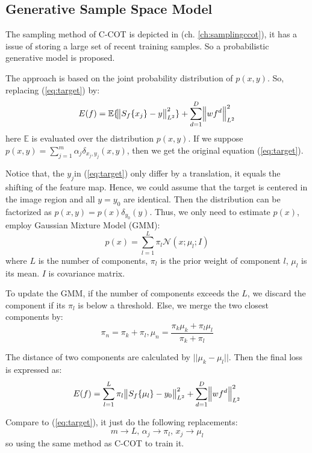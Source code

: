 \documentclass[12pt]{article}
\numberwithin{equation}{section}
\begin{document}
{\subsection{Generative Sample Space Model}
The sampling method of C-COT is depicted in (ch. \ref{ch:samplingccot}), it has a issue of storing a large set of recent training samples. So a probabilistic generative model is proposed. \par
The approach is based on the joint probability distribution of $p(x,y)$. So, replacing (\ref{eq:target}) by:
\begin{equation} 
	E(f)=\mathbb{E} \{\norm{S_f\{x_j\}-y}^2_{L^2} \}+ \sum^D_{d=1} \norm{w f^d}^2_{L^2} 
\end{equation}
here $\mathbb{E}$ is evaluated over the distribution $p(x,y)$. If we suppose $p(x,y)=\sum^m_{j=1}\alpha_j\delta_{x_j,y_j}(x,y)$, then we get the original equation (\ref{eq:target}). \par
Notice that, the $y_j$in (\ref{eq:target}) only differ by a translation, it equals the shifting of the feature map. Hence, we could assume that the target is centered in the image region and all $y=y_0$ are identical. Then the distribution can be factorized as $p(x,y)=p(x)\delta_{y_0}(y)$. Thus, we only need to estimate $p(x)$, employ Gaussian Mixture Model (GMM):
\begin{equation}
	p(x)=\sum^L_{l=1} \pi_l \mathcal{N} (x;\mu_l;I)
\end{equation}
where $L$ is the number of components, $\pi_l$ is the prior weight of component $l$, $\mu_l$ is its mean. $I$ is covariance matrix. \par
To update the GMM, if the number of components exceeds the $L$, we discard the component if its $\pi_l$ is below a threshold. Else, we merge the two closest components by:
\begin{equation} 
	\pi_n = \pi_k + \pi_l , \mu_n = \frac{\pi_k\mu_k+\pi_l\mu_l}{\pi_k+\pi_l}
\end{equation} \par
The distance of two components are calculated by $||\mu_k - \mu_l||$. Then the final loss is expressed as:
\begin{equation} 
	E(f)=\sum^L_{l=1} \pi_l \norm{S_f\{\mu_l\}-y_0}^2_{L^2} + \sum^D_{d=1} \norm{w f^d}^2_{L^2} 
\end{equation} \par
Compare to (\ref{eq:target}), it just do the following replacements:
\begin{equation} 
	m \rightarrow L \text{, } \alpha_j \rightarrow \pi_l \text{, } x_j \rightarrow \mu_l 
\end{equation}
so using the same method as C-COT to train it.
}
\end{document}
